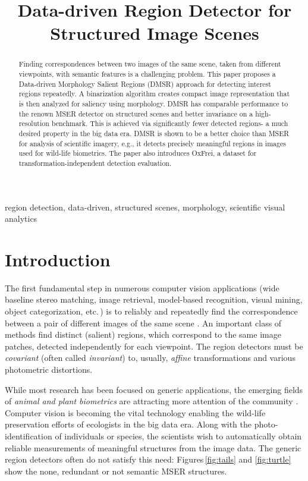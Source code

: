 \documentclass{article}
\title{Data-driven Region Detector for Structured Image Scenes}
\begin{document}
\maketitle

\begin{abstract}
Finding correspondences between two images of the same scene, taken from different viewpoints, with semantic features is a challenging problem.
This paper proposes a Data-driven Morphology Salient Regions (DMSR) approach for detecting interest regions repeatedly. 
A binarization algorithm creates compact image representation that is then analyzed for saliency using morphology.
DMSR has comparable performance to the renown MSER detector on structured scenes and better invariance on a high-resolution benchmark. 
This is achieved via significantly fewer detected regions- a much desired property in the big data era. 
DMSR is shown to be a better choice than MSER for analysis of scientific imagery, e.g.,
it detects precisely meaningful regions in images used for wild-life biometrics.
The paper also introduces OxFrei, a dataset for transformation-independent detection evaluation.
\end{abstract}

\begin{keywords}
region detection, data-driven, structured scenes, morphology, scientific visual analytics
\end{keywords}

\section{Introduction}
\label{sec:intro}
The first fundamental step in numerous computer vision applications (wide baseline stereo matching, image retrieval, model-based recognition, visual mining, object categorization, etc.\,) is to reliably and repeatedly find  the correspondence between a pair of different images of the same scene \cite{Matas2002BMVC, Rodriguez2013, EscaleraCVPR07}. An important class of methods find distinct (salient) regions, which correspond to the same image patches, detected independently for each viewpoint. The region detectors must be {\em covariant} (often called {\em invariant}) to, usually, {\em affine} transformations and various photometric distortions. 

While most research has been focused on generic applications, the emerging fields of {\em animal and plant biometrics} are attracting more attention of the community \cite{Kuehl2013, leafsnap_eccv2012}. Computer vision is becoming the vital technology enabling the wild-life preservation efforts of ecologists in the big data era. Along with the photo-identification of individuals or species, the scientists wish to automatically obtain reliable measurements of meaningful structures from the image data. The generic region detectors often do not satisfy this need: Figures\,\ref{fig:tails} and \ref{fig:turtle} show the none, redundant or not semantic MSER structures.
\end{document}
